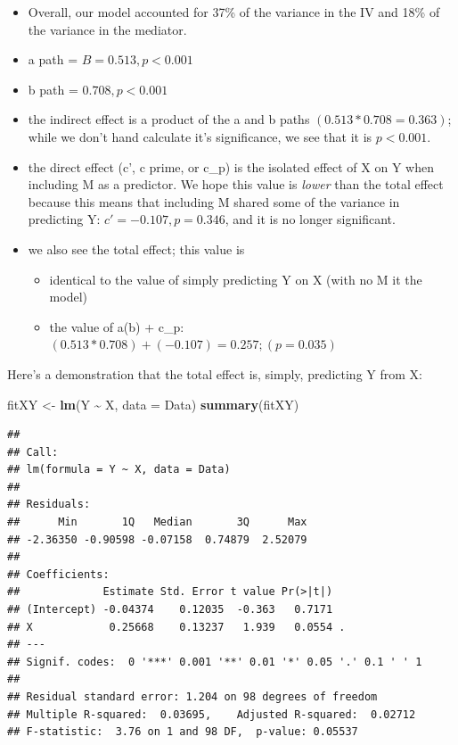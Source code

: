 \documentclass[
  11pt,
]{book}
\newenvironment{Shaded}{\begin{snugshade}}{\end{snugshade}}
\newcommand{\AttributeTok}[1]{\textcolor[rgb]{0.27,0.27,0.27}{#1}}
\newcommand{\FunctionTok}[1]{\textcolor[rgb]{0.27,0.27,0.27}{\textbf{#1}}}
\newcommand{\NormalTok}[1]{#1}
\newcommand{\OtherTok}[1]{\textcolor[rgb]{0.37,0.37,0.37}{#1}}
\newcommand{\SpecialCharTok}[1]{\textcolor[rgb]{0.43,0.43,0.43}{\textbf{#1}}}
\providecommand{\tightlist}{%
  \setlength{\itemsep}{0pt}\setlength{\parskip}{0pt}}
\begin{document}
\begin{itemize}
\tightlist
\item
  Overall, our model accounted for 37\% of the variance in the IV and 18\% of the variance in the mediator.
\item
  a path = \(B = 0.513, p < 0.001\)
\item
  b path = \(0.708, p < 0.001\)
\item
  the indirect effect is a product of the a and b paths \((0.513 * 0.708 = 0.363)\); while we don't hand calculate it's significance, we see that it is \(p < 0.001\).
\item
  the direct effect (c', c prime, or c\_p) is the isolated effect of X on Y when including M as a predictor. We hope this value is \emph{lower} than the total effect because this means that including M shared some of the variance in predicting Y: \(c' = -0.107, p = 0.346\), and it is no longer significant.
\item
  we also see the total effect; this value is

  \begin{itemize}
  \tightlist
  \item
    identical to the value of simply predicting Y on X (with no M it the model)
  \item
    the value of a(b) + c\_p: \((0.513 * 0.708) + (-0.107) = 0.257; (p = 0.035)\)
  \end{itemize}
\end{itemize}

Here's a demonstration that the total effect is, simply, predicting Y from X:

\begin{Shaded}
\begin{Highlighting}[]
\NormalTok{fitXY }\OtherTok{\textless{}{-}} \FunctionTok{lm}\NormalTok{(Y }\SpecialCharTok{\textasciitilde{}}\NormalTok{ X, }\AttributeTok{data =}\NormalTok{ Data)}
\FunctionTok{summary}\NormalTok{(fitXY)}
\end{Highlighting}
\end{Shaded}

\begin{verbatim}
## 
## Call:
## lm(formula = Y ~ X, data = Data)
## 
## Residuals:
##      Min       1Q   Median       3Q      Max 
## -2.36350 -0.90598 -0.07158  0.74879  2.52079 
## 
## Coefficients:
##             Estimate Std. Error t value Pr(>|t|)  
## (Intercept) -0.04374    0.12035  -0.363   0.7171  
## X            0.25668    0.13237   1.939   0.0554 .
## ---
## Signif. codes:  0 '***' 0.001 '**' 0.01 '*' 0.05 '.' 0.1 ' ' 1
## 
## Residual standard error: 1.204 on 98 degrees of freedom
## Multiple R-squared:  0.03695,    Adjusted R-squared:  0.02712 
## F-statistic:  3.76 on 1 and 98 DF,  p-value: 0.05537
\end{verbatim}
\end{document}
